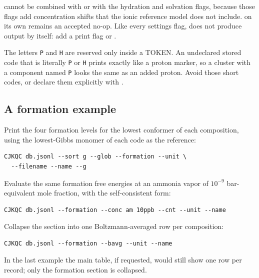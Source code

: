  cannot be combined with  or with the hydration and
solvation flags, because those flags add concentration shifts that the ionic
reference model does not include.  on its own remains an
accepted no-op. Like every settings flag,  does not produce
output by itself: add a print flag or .

\begin{warning}
The letters \texttt{P} and \texttt{H} are reserved only inside a TOKEN. An
undeclared stored code that is literally \texttt{P} or \texttt{H} prints
exactly like a proton marker, so a cluster with a component named
\texttt{P} looks the same as an added proton. Avoid those short codes, or
declare them explicitly with .
\end{warning}

\subsection{A formation example}\label{sec:formation-example}

Print the four formation levels for the lowest conformer of each
composition, using the lowest-Gibbs monomer of each code as the reference:

\begin{verbatim}
CJKQC db.jsonl --sort g --glob --formation --unit \
  --filename --name --g
\end{verbatim}

Evaluate the same formation free energies at an ammonia vapor of
$10^{-9}$ bar-equivalent mole fraction, with the self-consistent form:

\begin{verbatim}
CJKQC db.jsonl --formation --conc am 10ppb --cnt --unit --name
\end{verbatim}

Collapse the section into one Boltzmann-averaged row per composition:

\begin{verbatim}
CJKQC db.jsonl --formation --bavg --unit --name
\end{verbatim}

In the last example the main table, if requested, would still show one row
per record; only the formation section is collapsed.
